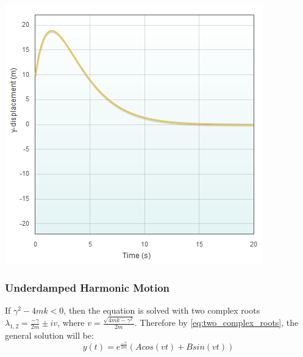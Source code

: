 \documentclass[11pt]{article} %
\newenvironment{Figure}
  {\par\medskip\noindent\minipage{\linewidth}}
  {\endminipage\par\medskip}
\begin{document}
\begin{multicols}{2}
\begin{Figure}
 \centering
 \includegraphics[width=\linewidth]{critically_damped_free.png}
\end{Figure}

\subsubsection {Underdamped Harmonic Motion}
If ${\gamma}^2 - 4mk < 0$, then the equation is solved with two complex roots ${\lambda}_{1,2} = \frac{-\gamma}{2m} \pm iv$, where $v = \frac{\sqrt{4mk - {\gamma}^2}}{2m}$. Therefore by \eqref{eq:two_complex_roots}, the general solution will be:
\begin{equation}
y(t) = e^{{\frac{-\gamma}{2m}}}(Acos(vt) + Bsin(vt))
\end{equation}


\end{multicols}
\end{document}
